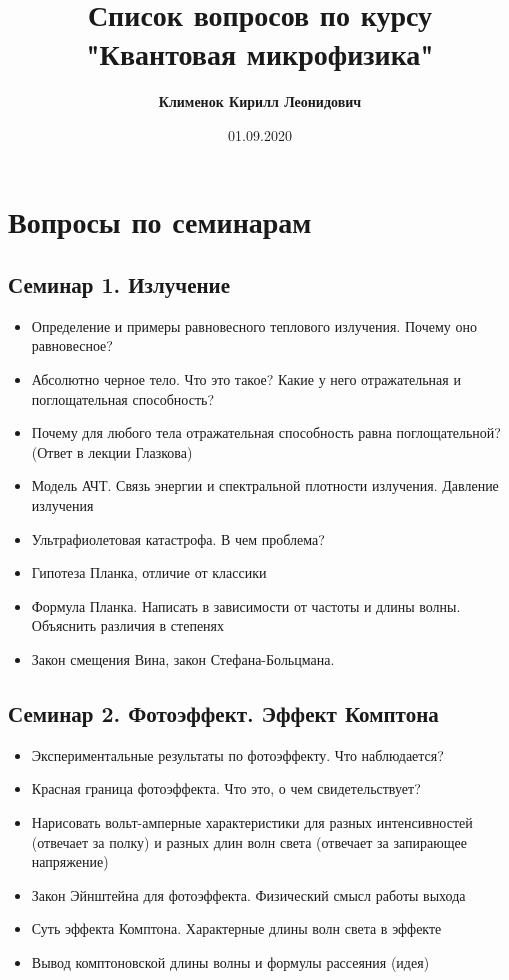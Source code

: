 \documentclass[12pt]{article}
\begin{document}
 
\title{\textbf{Список вопросов по курсу "Квантовая микрофизика" }}
\author{\textbf{Клименок Кирилл Леонидович}}
\date{01.09.2020}
\maketitle
\section*{Вопросы по семинарам}
\subsection*{Семинар 1. Излучение}
\begin{itemize}
    \item Определение и примеры равновесного теплового излучения. Почему оно равновесное?
    \item Абсолютно черное тело. Что это такое? Какие у него отражательная и поглощательная способность?
    \item Почему для любого тела отражательная способность равна поглощательной? (Ответ в лекции Глазкова)
    \item Модель АЧТ. Связь энергии и спектральной плотности излучения. Давление излучения
    \item Ультрафиолетовая катастрофа. В чем проблема?
    \item Гипотеза Планка, отличие от классики
    \item Формула Планка. Написать в зависимости от частоты и длины волны. Объяснить различия в степенях
    \item Закон смещения Вина, закон Стефана-Больцмана. 
\end{itemize}
\subsection*{Семинар 2. Фотоэффект. Эффект Комптона}
\begin{itemize}
    \item Экспериментальные результаты по фотоэффекту. Что наблюдается?
    \item Красная граница фотоэффекта. Что это, о чем свидетельствует?
    \item Нарисовать вольт-амперные характеристики для разных интенсивностей (отвечает за полку) и разных длин волн света (отвечает за запирающее напряжение)
    \item Закон Эйнштейна для фотоэффекта. Физический смысл работы выхода
    \item Суть эффекта Комптона. Характерные длины волн света в эффекте
    \item Вывод комптоновской длины волны и формулы рассеяния (идея)
\end{itemize}
\end{document}
